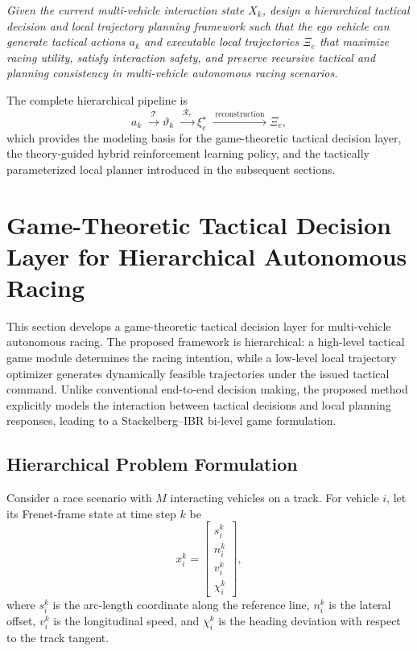\documentclass[final ,3p, times]{elsarticle}
\begin{document}
\emph{Given the current multi-vehicle interaction state $X_k$, design a hierarchical tactical decision and local trajectory planning framework such that the ego vehicle can generate tactical actions $a_k$ and executable local trajectories $\Xi_e$ that maximize racing utility, satisfy interaction safety, and preserve recursive tactical and planning consistency in multi-vehicle autonomous racing scenarios.}

The complete hierarchical pipeline is
\begin{equation}
a_k
\;\xrightarrow{\;\mathcal{T}\;}
\vartheta_k
\;\xrightarrow{\;\mathcal{R}_e\;}
\xi_e^\star
\;\xrightarrow{\;\text{reconstruction}\;}
\Xi_e,
\label{eq:problem_pipeline}
\end{equation}
which provides the modeling basis for the game-theoretic tactical decision layer, the theory-guided hybrid reinforcement learning policy, and the tactically parameterized local planner introduced in the subsequent sections.




\section{Game-Theoretic Tactical Decision Layer for Hierarchical Autonomous Racing}
\label{sec:method_game}

This section develops a game-theoretic tactical decision layer for multi-vehicle autonomous racing. The proposed framework is hierarchical: a high-level tactical game module determines the racing intention, while a low-level local trajectory optimizer generates dynamically feasible trajectories under the issued tactical command. Unlike conventional end-to-end decision making, the proposed method explicitly models the interaction between tactical decisions and local planning responses, leading to a Stackelberg--IBR bi-level game formulation.




\subsection{Hierarchical Problem Formulation}
\label{subsec:hierarchical_problem}

Consider a race scenario with $M$ interacting vehicles on a track. For vehicle $i$, let its Frenet-frame state at time step $k$ be
\begin{equation}
x_i^k =
\begin{bmatrix}
s_i^k \\
n_i^k \\
v_i^k \\
\chi_i^k
\end{bmatrix},
\label{eq:vehicle_state}
\end{equation}
where $s_i^k$ is the arc-length coordinate along the reference line, $n_i^k$ is the lateral offset, $v_i^k$ is the longitudinal speed, and $\chi_i^k$ is the heading deviation with respect to the track tangent.
\end{document}
